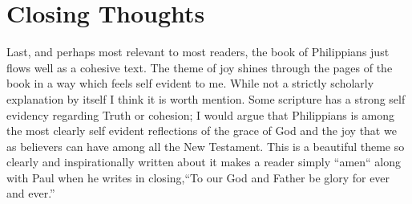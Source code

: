 \documentclass[12pt]{turabian-researchpaper}
\begin{document}
\section{Closing Thoughts}
Last, and perhaps most relevant to most readers, the book of Philippians just flows well as a cohesive text. The theme of joy shines through the pages of the book in a way which feels self evident to me. While not a strictly scholarly explanation by itself I think it is worth mention. Some scripture has a strong self evidency regarding Truth or cohesion; I would argue that Philippians is among the most clearly self evident reflections of the grace of God and the joy that we as believers can have among all the New Testament. This is a beautiful theme so clearly and inspirationally written about it makes a reader simply ``amen`` along with Paul when he writes in closing,``To our God and Father be glory for ever and ever.''
\newpage


\printbibliography
\end{document}
